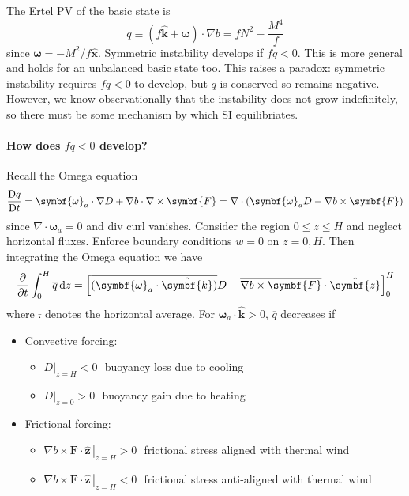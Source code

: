 \documentclass{jknotes}
\begin{document}
The Ertel PV of the basic state is
\begin{equation}
	 q \equiv (f\hat{\symbf{k}} + \symbf{\omega})\cdot\nabla b = fN^2 -
	 \frac{M^4}{f}
 \end{equation}
 since $\symbf{\omega} = -M^2/f \hat{\symbf{x}}$. Symmetric instability
 develops if $fq < 0$. This is more general and holds for an unbalanced basic
 state too. This raises a paradox: symmetric instability requires $fq < 0$ to
 develop, but $q$ is conserved so remains negative. However, we know
 observationally that the instability does not grow indefinitely, so there
 must be some mechanism by which SI equilibriates. 
 
 \paragraph{How does $fq < 0$ develop?}
 Recall the Omega equation
 \begin{equation}
	 \frac{\diffD q}{\diffD t} = \symbf{\omega}_a \cdot \nabla D + \nabla b
	 \cdot \nabla \times \symbf{F} = \nabla \cdot (\symbf{\omega}_a D - \nabla
	 b \times \symbf{F})
 \end{equation}
since $\nabla \cdot \symbf{\omega}_a = 0$ and div curl vanishes. Consider the
region $0 \le z \le H$ and neglect horizontal fluxes.  Enforce boundary
conditions $w = 0$ on $z=0, H$. Then integrating the Omega equation we have
\begin{equation}
	\frac{\partial}{\partial t} \int_0^H \overline{q} \, \diffd z = \left[
		\overline{(\symbf{\omega}_a \cdot \hat{\symbf{k}})}D - \overline{\nabla b \times
	\symbf{F}}\cdot\hat{\symbf{z}}\right]_0^H
\end{equation}
where $\bar{.}$ denotes the horizontal average. For $\symbf{\omega}_a \cdot
\hat{\symbf{k}} > 0$, $\overline{q}$ decreases if
\begin{itemize}
	\item Convective forcing:
		\begin{itemize}
			\item $\left.D\right|_{z=H} < 0$ \,\,buoyancy loss due to cooling
			\item $\left.D\right|_{z=0} > 0$ \,\,buoyancy gain due to heating
		\end{itemize}
	\item Frictional forcing:
		\begin{itemize}
			\item $\nabla b \times \left.\symbf{F}\cdot\hat{\symbf{z}}\, \right|_{z=H} > 0$\,\,
					frictional stress aligned with thermal wind
			\item $\nabla b \times \left.\symbf{F}\cdot\hat{\symbf{z}} \,\right|_{z=H} < 0$\,\,
					frictional stress anti-aligned with thermal wind
		\end{itemize}
\end{itemize}
\end{document}
